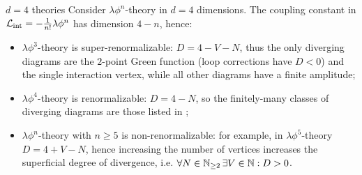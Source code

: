 \begin{example}{$ d = 4 $ theories}{}
  Consider $ \lambda \phi^n $-theory in $ d = 4 $ dimensions. The coupling constant in $ \mathcal{L}_\text{int} = - \frac{1}{n!} \lambda \phi^n $ has dimension $ 4 - n $, hence:
  \begin{itemize}
    \item $ \lambda \phi^3 $-theory is super-renormalizable: $ D = 4 - V - N $, thus the only diverging diagrams are the $ 2 $-point Green function (loop corrections have $ D < 0 $) and the single interaction vertex, while all other diagrams have a finite amplitude;
    \item $ \lambda \phi^4 $-theory is renormalizable: $ D = 4 - N $, so the finitely-many classes of diverging diagrams are those listed in ;
    \item $ \lambda \phi^n $-theory with $ n \ge 5 $ is non-renormalizable: for example, in $ \lambda \phi^5 $-theory $ D = 4 + V - N $, hence increasing the number of vertices increases the superficial degree of divergence, i.e. $ \forall N \in \mathbb{N}_{\ge 2} \, \exists V \in \mathbb{N} : D > 0 $.
  \end{itemize}
\end{example}

